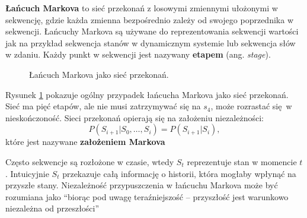 \documentclass[a4paper, 12pt,oneside]{book}
\begin{document}
\textbf{Łańcuch Markova} to sieć przekonań z losowymi zmiennymi ułożonymi w
sekwencję, gdzie każda zmienna bezpośrednio zależy od swojego poprzednika w
sekwencji. Łańcuchy Markova są używane do reprezentowania sekwencji wartości
jak na przykład sekwencja stanów w dynamicznym systemie lub sekwencja słów w
zdaniu. Każdy punkt w sekwencji jest nazywany \textbf{etapem} (ang.
\textit{stage}).
\begin{figure}[!htb]
\begin{center}
\caption{Łańcuch Markova jako sieć przekonań.}
\label{markov_chain}
\end{center}
\end{figure}
Rysunek \ref{markov_chain} pokazuje ogólny przypadek łańcucha Markova jako sieć
przekonań. Sieć ma pięć etapów, ale nie musi zatrzymywać się na $s_4$, może
rozrastać się w nieskończoność. Sieci przekonań opierają się na założeniu
niezależności: \[P(S_{i+1} | S_0, \dots , S_i) = P(S_{i+1} | S_i),\]
które jest nazywane \textbf{założeniem Markova}

Często sekwencje są rozłożone w czasie, wtedy $S_t$ reprezentuje stan w
momencie $t$. Intuicyjnie $S_t$ przekazuje całą informację o historii, która
mogłaby wpłynąć na przyszłe stany. Niezależność przypuszczenia w łańcuchu
Markova może być rozumiana jako ``biorąc pod uwagę teraźniejszość -- przyszłość
jest warunkowo niezależna od przeszłości''
\end{document}
